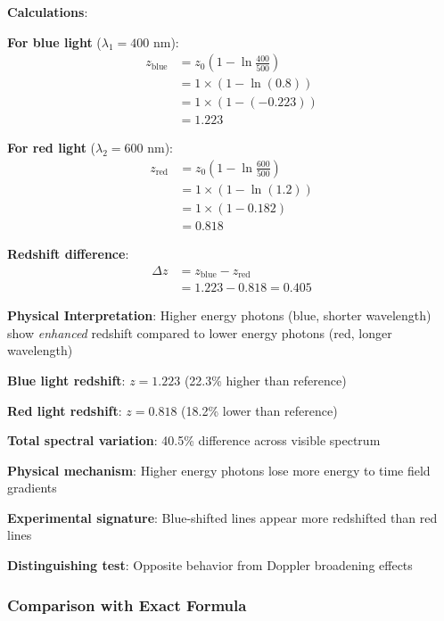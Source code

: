 \documentclass[12pt,a4paper]{article}
\begin{document}
	\textbf{Calculations}:
	
	\textbf{For blue light} ($\lambda_1 = 400$ nm):
	\begin{align}
		z_{\text{blue}} &= z_0\left(1 - \ln\frac{400}{500}\right) \\
		&= 1 \times \left(1 - \ln(0.8)\right) \\
		&= 1 \times (1 - (-0.223)) \\
		&= 1.223
		\label{eq:blue_redshift_calculation}
	\end{align}
	
	\textbf{For red light} ($\lambda_2 = 600$ nm):
	\begin{align}
		z_{\text{red}} &= z_0\left(1 - \ln\frac{600}{500}\right) \\
		&= 1 \times \left(1 - \ln(1.2)\right) \\
		&= 1 \times (1 - 0.182) \\
		&= 0.818
		\label{eq:red_redshift_calculation}
	\end{align}
	
	\textbf{Redshift difference}:
	\begin{align}
		\Delta z &= z_{\text{blue}} - z_{\text{red}} \\
		&= 1.223 - 0.818 = 0.405
		\label{eq:wavelength_redshift_difference}
	\end{align}
	
	\begin{tcolorbox}[colback=green!5!white,colframe=green!75!black,title=Wavelength-Dependent Redshift Prediction]
		\textbf{Physical Interpretation}: Higher energy photons (blue, shorter wavelength) show \textit{enhanced} redshift compared to lower energy photons (red, longer wavelength)
		
		\textbf{Blue light redshift}: $z = 1.223$ (22.3\% higher than reference)
		
		\textbf{Red light redshift}: $z = 0.818$ (18.2\% lower than reference)
		
		\textbf{Total spectral variation}: 40.5\% difference across visible spectrum
		
		\textbf{Physical mechanism}: Higher energy photons lose more energy to time field gradients
		
		\textbf{Experimental signature}: Blue-shifted lines appear more redshifted than red lines
		
		\textbf{Distinguishing test}: Opposite behavior from Doppler broadening effects
	\end{tcolorbox}
	
	\subsubsection{Comparison with Exact Formula}
	\label{subsubsec:exact_comparison}
	
\end{document}
